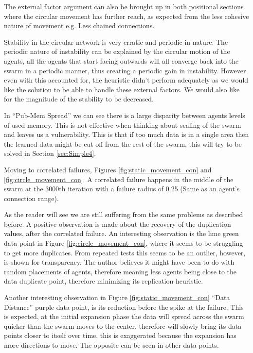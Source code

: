\documentclass{UoYCSproject}
\begin{document}
The external factor argument can also be brought up in both positional sections where the circular movement has further reach, as expected from the less cohesive nature of movement e.g. Less chained connections.

Stability in the circular network is very erratic and periodic in nature. 
The periodic nature of instability can be explained by the circular motion of the agents, all the agents that start facing outwards will all converge back into the swarm in a periodic manner, thus creating a periodic gain in instability. 
However even with this accounted for, the heuristic didn’t perform adequately as we would like the solution to be able to handle these external factors. 
We would also like for the magnitude of the stability to be decreased. 

In “Pub-Mem Spread” we can see there is a large disparity between agents levels of used memory. 
This is not effective when thinking about scaling of the swarm and leaves us a vulnerability. 
This is that if too much data is in a single area then the learned data might be cut off from the rest of the swarm, this will try to be solved in Section \ref{sec:Simple4}.

Moving to correlated failures, Figures \ref{fig:static_movement_con} and \ref{fig:circle_movement_con}. 
A correlated failure happens in the middle of the swarm at the 3000th iteration with a failure radius of 0.25 (Same as an agent's connection range). 

As the reader will see we are still suffering from the same problems as described before. 
A positive observation is made about the recovery of the duplication values, after the correlated failure. 
An interesting observation is the lime green data point in Figure \ref{fig:circle_movement_con}, where it seems to be struggling to get more duplicates. 
From repeated tests this seems to be an outlier, however, is shown for transparency. 
The author believes it might have been to do with random placements of agents, therefore meaning less agents being close to the data duplicate point, therefore minimizing its replication heuristic.

Another interesting observation in Figure \ref{fig:static_movement_con} “Data Distance” purple data point, is its reduction before the spike at the failure. 
This is expected, at the initial expansion phase the data will spread across the swarm quicker than the swarm moves to the center, therefore will slowly bring its data points closer to itself over time, this is exaggerated because the expansion has more directions to move. 
The opposite can be seen in other data points.
\end{document}
